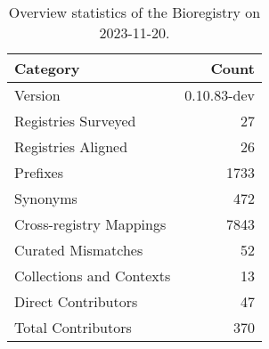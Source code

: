 \begin{table}
\caption{Overview statistics of the Bioregistry on 2023-11-20.}
\label{tab:bioregistry-summary}
\begin{tabular}{lr}
\toprule
Category & Count \\
\midrule
Version & 0.10.83-dev \\
Registries Surveyed & 27 \\
Registries Aligned & 26 \\
Prefixes & 1733 \\
Synonyms & 472 \\
Cross-registry Mappings & 7843 \\
Curated Mismatches & 52 \\
Collections and Contexts & 13 \\
Direct Contributors & 47 \\
Total Contributors & 370 \\
\bottomrule
\end{tabular}
\end{table}
